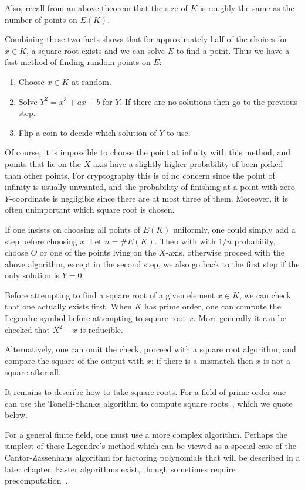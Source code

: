 Also, recall from an above theorem that the size of $K$ is roughly the same
as the number of points on $E(K)$.

Combining these two facts shows that
for approximately half of the choices for $x \in K$,
a square root exists and we can solve $E$ to
find a point. Thus we have a fast method of finding random points on
$E$:

\begin{enumerate}
\item
Choose $x \in K$ at random.
\item
Solve $Y^2 = x^3 + a x + b$ for $Y$. If there are no solutions
then go to the previous step.
\item
Flip a coin to decide which solution of $Y$ to use.
\end{enumerate}

Of course, it is impossible to choose the point at infinity with this method,
and points that lie on the $X$-axis have a slightly higher probability of
been picked than other points. For cryptography this is of no concern
since the point of infinity is usually unwanted, and the probability
of finishing at a point with zero $Y$-coordinate is negligible since there
are at most three of them. Moreover, it is often unimportant which
square root is chosen.

If one insists on choosing all points of $E(K)$ uniformly, one could simply
add a step before choosing $x$.
Let $n = \#E(K)$. Then with
with $1/n$ probability,
choose $O$ or one of the points lying
on the $X$-axis, otherwise proceed with the above algorithm, except
in the second step, we also go back to the first step if the only solution
is $Y = 0$.

Before attempting to find a square root of a given element $x \in K$,
we can check that one actually exists first.
When $K$ has prime order,
one can compute the Legendre symbol before attempting to square root $x$.
More generally it can be checked that $X^2 - x$ is reducible.

Alternatively,
one can omit the check, proceed with a square root algorithm,
and compare the square of the output with $x$: if there is a mismatch
then $x$ is not a square after all.

It remains to describe how to take square roots.
For a field of prime order one can use the Tonelli-Shanks algorithm
to compute square roots~\cite{bss, handbook}, which we quote below.

For a general finite field,
one must use a more complex algorithm. Perhaps the simplest of these
Legendre's method which can be viewed as a special
case of the Cantor-Zassenhaus algorithm for factoring polynomials that
will be described in a later chapter.
Faster algorithms exist, though sometimes require precomputation~\cite{djb}.

